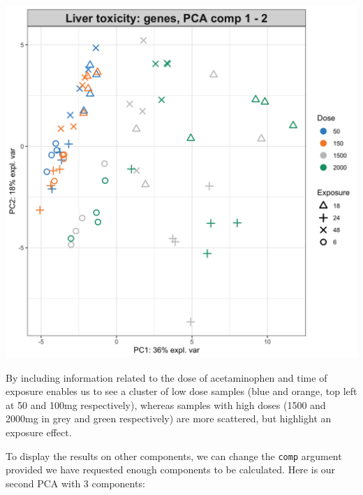 \documentclass[]{book}
\newenvironment{Shaded}{\begin{snugshade}}{\end{snugshade}}
\newcommand{\DataTypeTok}[1]{\textcolor[rgb]{0.13,0.29,0.53}{#1}}
\newcommand{\DecValTok}[1]{\textcolor[rgb]{0.00,0.00,0.81}{#1}}
\newcommand{\KeywordTok}[1]{\textcolor[rgb]{0.13,0.29,0.53}{\textbf{#1}}}
\newcommand{\NormalTok}[1]{#1}
\newcommand{\OperatorTok}[1]{\textcolor[rgb]{0.81,0.36,0.00}{\textbf{#1}}}
\newcommand{\OtherTok}[1]{\textcolor[rgb]{0.56,0.35,0.01}{#1}}
\newcommand{\StringTok}[1]{\textcolor[rgb]{0.31,0.60,0.02}{#1}}
\begin{document}
\begin{center}\includegraphics[width=0.75\linewidth,]{Figures/03-pca-liver-1-plot-1} \end{center}

By including information related to the dose of acetaminophen and time of exposure enables us to see a cluster of low dose samples (blue and orange, top left at 50 and 100mg respectively), whereas samples with high doses (1500 and 2000mg in grey and green respectively) are more scattered, but highlight an exposure effect.

To display the results on other components, we can change the \texttt{comp} argument provided we have requested enough components to be calculated. Here is our second PCA with 3 components:

\begin{Shaded}
\end{Shaded}
\end{document}
